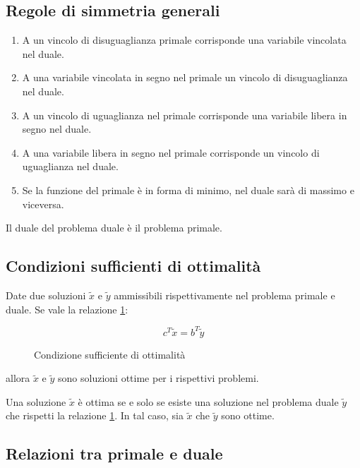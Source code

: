 \documentclass[\main/main.tex]{subfiles}
\begin{document}
\subsection{Regole di simmetria generali}

\begin{enumerate}
  \item A un vincolo di disuguaglianza primale corrisponde una variabile vincolata nel duale.
  \item A una variabile vincolata in segno nel primale un vincolo di disuguaglianza nel duale.
  \item A un vincolo di uguaglianza nel primale corrisponde una variabile libera in segno nel duale.
  \item A una variabile libera in segno nel primale corrisponde un vincolo di uguaglianza nel duale.
  \item Se la funzione del primale è in forma di minimo, nel duale sarà di massimo e viceversa.
\end{enumerate}

Il duale del problema duale è il problema primale.

\subsection{Condizioni sufficienti di ottimalità}

\begin{theorem}
  Date due soluzioni $\tilde{x}$ e $\tilde{y}$ ammissibili rispettivamente nel problema primale e duale. Se vale la relazione \ref{dualita_forte}:

  \begin{figure}
    \[
      c^T \tilde{x} = b^T \tilde{y}
    \]
    \caption{Condizione sufficiente di ottimalità}
    \label{dualita_forte}
  \end{figure}

  allora $\tilde{x}$ e $\tilde{y}$ sono soluzioni ottime per i rispettivi problemi.

  Una soluzione $\tilde{x}$ è ottima se e solo se esiste una soluzione nel problema duale $\tilde{y}$ che rispetti la relazione \ref{dualita_forte}. In tal caso, sia $\tilde{x}$ che $\tilde{y}$ sono ottime.
\end{theorem}

\subsection{Relazioni tra primale e duale}
\end{document}
